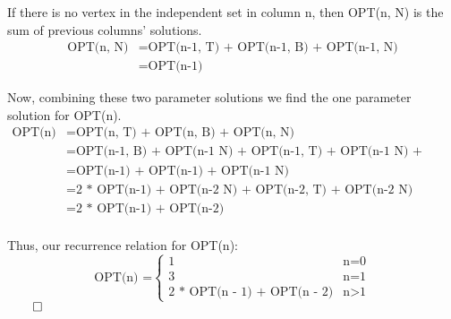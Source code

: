 \documentclass[11pt]{article}
\begin{document}
If there is no vertex in the independent set in column n, then OPT(n, N) is the sum of previous columns' solutions.
\begin{align*}
\text{OPT(n, N)} &= \text{OPT(n-1, T) + OPT(n-1, B) + OPT(n-1, N)} \\
	&= \text{OPT(n-1)}
\end{align*}

Now, combining these two parameter solutions we find the one parameter solution for OPT(n).
\begin{align*}
\text{OPT(n)} &= \text{OPT(n, T) + OPT(n, B) + OPT(n, N)} \\
	&= \text{OPT(n-1, B) + OPT(n-1 N) + OPT(n-1, T) + OPT(n-1 N) + OPT(n-1)} \\
	&= \text{OPT(n-1) + OPT(n-1) + OPT(n-1 N)} \\
	&= \text{2 * OPT(n-1) + OPT(n-2 N) + OPT(n-2, T) + OPT(n-2 N)} \\
	&= \text{2 * OPT(n-1) + OPT(n-2)} \\
\end{align*}

Thus, our recurrence relation for OPT(n):
\[
\text{OPT(n) =} 
\begin{cases} 
      \text{1} & \text{n=0} \\
      \text{3} & \text{n=1} \\
      \text{2 * OPT(n - 1) + OPT(n - 2)} & \text{n$>$1}
   \end{cases}
\]
$\qed$
\end{document}
